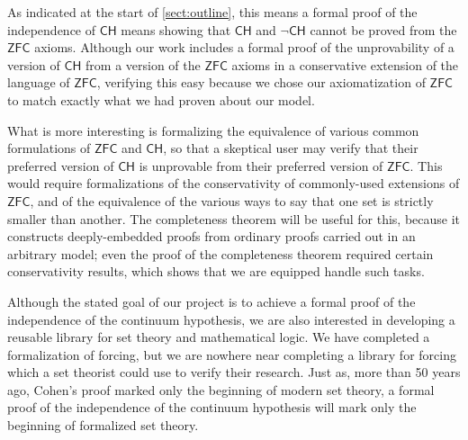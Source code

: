 \documentclass[a4paper,USenglish,cleveref, autoref]{lipics-v2019}
\theoremstyle{definition}
\begin{document}
As indicated at the start of \autoref{sect:outline}, this means a formal proof of the independence of $\mathsf{CH}$ means showing that $\mathsf{CH}$ and $\neg\mathsf{CH}$ cannot be proved from the $\mathsf{ZFC}$ axioms. Although our work includes a formal proof of the unprovability of a version of $\mathsf{CH}$ from a version of the $\mathsf{ZFC}$ axioms in a conservative extension of the language of $\mathsf{ZFC}$, verifying this easy because we chose our axiomatization of $\mathsf{ZFC}$ to match exactly what we had proven about our model.

What is more interesting is formalizing the equivalence of various common formulations of $\mathsf{ZFC}$ and $\mathsf{CH}$, so that a skeptical user may verify that their preferred version of $\mathsf{CH}$ is unprovable from their preferred version of $\mathsf{ZFC}$. This would require formalizations of the conservativity of commonly-used extensions of $\mathsf{ZFC}$, and of the equivalence of the various ways to say that one set is strictly smaller than another. The completeness theorem will be useful for this, because it constructs deeply-embedded proofs from ordinary proofs carried out in an arbitrary model; even the proof of the completeness theorem required certain conservativity results, which shows that we are equipped handle such tasks.

Although the stated goal of our project is to achieve a formal proof of the independence of the continuum hypothesis, we are also interested in developing a reusable library for set theory and mathematical logic. We have completed a formalization of forcing, but we are nowhere near completing a library for forcing which a set theorist could use to verify their research. Just as, more than 50 years ago, Cohen's proof marked only the beginning of modern set theory, a formal proof of the independence of the continuum hypothesis will mark only the beginning of formalized set theory.


\end{document}
